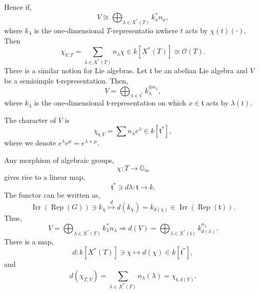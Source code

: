 \documentclass[10pt]{article}
\numberwithin{equation}{theorem}
\DeclareMathOperator{\Irr}{Irr}
\DeclareMathOperator{\Rep}{Rep}
\newcommand{\Ouv}[0]{\mathcal{O}}
\newcommand{\G}[0]{\mathbb{G}}
\newcommand{\tl}[0]{\mathfrak{t}}
\begin{document}
 Hence if,
  \begin{equation*}
    V\cong \bigoplus_{\lambda\in X^*(T)}k_x^*{n_x},
  \end{equation*}
  where $k_\lambda$ is the one-dimensional $T$-representatio nwhere $t$ acts by $\chi(t)(\cdot)$.
  Then 
  \begin{equation*}
    \chi_{V,T} = \sum_{\lambda\in X^*(T)}n_\lambda \chi\in k[X^*(T)]\cong\Ouv(T).
  \end{equation*}
  There is a similar notion for Lie algebras. Let $\mathfrak{t}$ be an abelian Lie algebra and $V$ be a semisimple $\mathfrak{t}$-representation.
  Then,
  \begin{equation*}
    V=\bigoplus_{\lambda\in\mathfrak{t}^*}k_\lambda^{\oplus n_\lambda},
  \end{equation*}
  where $k_\lambda$ is the one-dimensional $\mathfrak{t}$-representation on which $x\in\mathfrak{t}$ acts by $\lambda(t)$.
  \par The character of $V$ is 
  \begin{equation*}
    \chi_{\mathfrak{t},V} = \sum n_\lambda e^\lambda\in k[\mathfrak{t}^*],
  \end{equation*}
  where we denote $e^\lambda e^\mu = e^{\lambda+\mu}$.\\
  \par Any morphism of algebraic groups,
  \begin{equation*}
    \chi:T\to\G_m
  \end{equation*}
  gives rise to a linear map,
  \begin{equation*}
    \mathfrak{t}^*\ni d\lambda:\mathfrak{t}\to k.
  \end{equation*}
  The functor can be written as,
  \begin{equation*}
    \Irr(\Rep(G))\ni k_\chi\stackrel{d}{\mapsto}d(k_\chi) = k_{d(\chi)}\in\Irr(\Rep(\tl)).
  \end{equation*}
  Thus,
  \begin{equation*}
    V=\bigoplus_{\lambda\in X^*(T)}k_\lambda^*{n_\lambda} \Rightarrow d(V) = \bigoplus_{\lambda\in X^*(\tl)}k_{d(\lambda)}^{n_\lambda}.
  \end{equation*}
  There is a map,
  \begin{equation*}
    d:k[X^*(T)]\ni \chi\mapsto d(\chi)\in k[\tl^*],
  \end{equation*}
  and 
  \begin{equation*}
    d(\chi_{T,V}) = \sum_{\lambda\in X^*(T)}n_\lambda(\lambda) = \chi_{\tl,d(V)}.
  \end{equation*}
\end{document}
